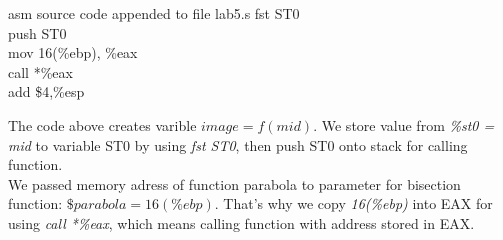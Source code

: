 \documentclass{article}
\begin{document}
\begin{multicols}{2}
\begin{GFT}{asm source code appended to file lab5.s}
\+fst ST0\\
\+push ST0\\
\+mov 16(\%ebp), \%eax\\
\+call *\%eax 	\\
\+add \$4,\%esp\\
\end{GFT}
The code above creates varible \(image = f(mid)\). We store value from \textit{\%st0 = mid} to variable ST0 by using \textit{fst ST0}, then push ST0 onto stack for calling function. \\ 
We passed memory adress of function parabola to parameter for bisection function: \(\$parabola = 16(\%ebp)\). That's why we copy \textit{16(\%ebp)} into EAX for using \textit{call *\%eax}, which means calling function with address stored in EAX.
\end{multicols}
\pagebreak
\end{document}
